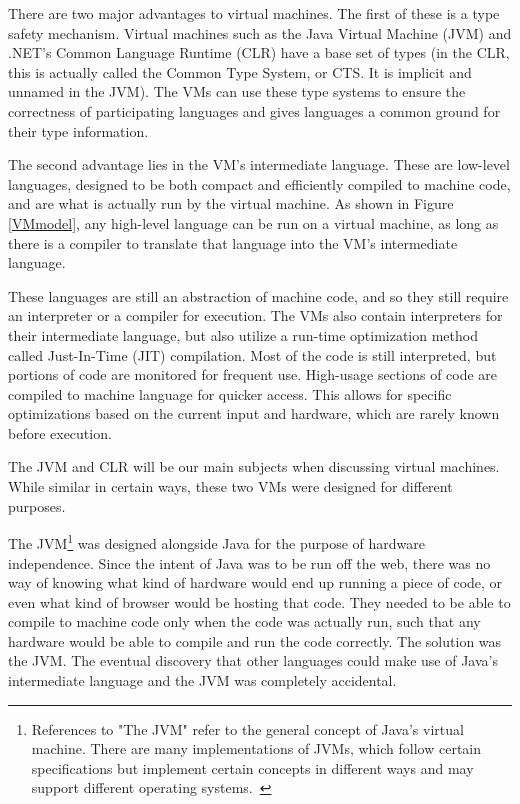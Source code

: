 \documentclass{sig-alternate}
\begin{document}
There are two major advantages to virtual machines. The first of these is a type safety mechanism. Virtual machines such as the Java Virtual Machine (JVM) and .NET's Common Language Runtime (CLR) have a base set of types (in the CLR, this is actually called the Common Type System, or CTS. It is implicit and unnamed in the JVM). The VMs can use these type systems to ensure the correctness of participating languages and gives languages a common ground for their type information.

The second advantage lies in the VM's intermediate language. These are low-level languages, designed to be both compact and efficiently compiled to machine code, and are what is actually run by the virtual machine. As shown in Figure \ref{VMmodel}, any high-level language can be run on a virtual machine, as long as there is a compiler to translate that language into the VM's intermediate language.

These languages are still an abstraction of machine code, and so they still require an interpreter or a compiler for execution.
The VMs also contain interpreters for their intermediate language, but also utilize a run-time optimization method called Just-In-Time (JIT) compilation. Most of the code is still interpreted, but portions of code are monitored for frequent use. High-usage sections of code are compiled to machine language for quicker access. This allows for specific optimizations based on the current input and hardware, which are rarely known before execution.~\cite{wiki:JIT}



The JVM and CLR will be our main subjects when discussing virtual machines. While similar in certain ways, these two VMs were designed for different purposes.

The JVM\footnote{References to "The JVM" refer to the general concept of Java's virtual machine. There are many implementations of JVMs, which follow certain specifications but implement certain concepts in different ways and may support different operating systems.~\cite{wiki:multiJVM, wiki:JVM}}
was designed alongside Java for the purpose of hardware independence. Since the intent of Java was to be run off the web, there was no way of knowing what kind of hardware would end up running a piece of code, or even what kind of browser would be hosting that code. They needed to be able to compile to machine code only when the code was actually run, such that any hardware would be able to compile and run the code correctly. The solution was the JVM. The eventual discovery that other languages could make use of Java's intermediate language and the JVM was completely accidental.
\end{document}

